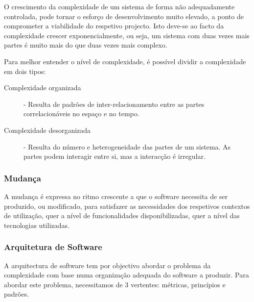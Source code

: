 \documentclass[a4paper,12pt]{article}
\begin{document}
O crescimento da complexidade de um sistema de forma não adequadamente controlada, pode tornar o esforço de desenvolvimento muito elevado, a ponto de comprometer a viabilidade do respetivo projecto. Isto deve-se ao facto da complexidade crescer exponencialmente, ou seja, um sistema com duas vezes mais partes é muito mais do que duas vezes mais complexo.

Para melhor entender o nível de complexidade, é possível dividir a complexidade em dois tipos:
\begin{description}
	\item[Complexidade organizada] - Resulta de padrões de inter-relacionamento entre as partes correlacionáveis no espaço e no tempo. 
	\item[Complexidade desorganizada] - Resulta do número e heterogeneidade das partes de um sistema. As partes podem interagir entre si, mas a interacção é irregular.
\end{description}

\subsubsection{Mudança}
A mudança é expressa no ritmo crescente a que o software necessita de ser produzido, ou modificado, para satisfazer as necessidades dos respetivos contextos de utilização, quer a nível de funcionalidades disponibilizadas, quer a nível das tecnologias utilizadas.

\subsubsection{Arquitetura de Software}
A arquitectura de software tem por objectivo abordar o problema da complexidade com base numa organização adequada do software a produzir.
Para abordar este problema, necessitamos de 3 vertentes: métricas, princípios e padrões.
\end{document}
